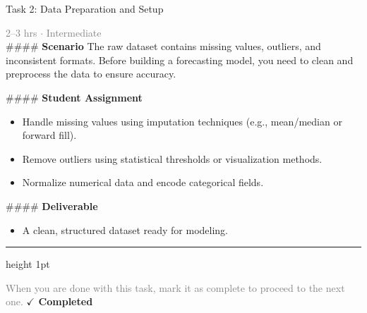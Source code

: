 \documentclass[10pt,a4paper]{article}
\begin{document}
\begin{taskbox}{Task 2: Data Preparation and Setup}

    {\small \textcolor{gray}{2--3 hrs $\cdot$ Intermediate}}\\[12pt]

    \#\#\#\# \textbf{Scenario}  
The raw dataset contains missing values, outliers, and inconsistent formats. Before building a forecasting model, you need to clean and preprocess the data to ensure accuracy.

\#\#\#\# \textbf{Student Assignment}  
\begin{itemize}
    \item Handle missing values using imputation techniques (e.g., mean/median or forward fill).  
    \item Remove outliers using statistical thresholds or visualization methods.  
    \item Normalize numerical data and encode categorical fields.  
\end{itemize}

\#\#\#\# \textbf{Deliverable}  
\begin{itemize}
    \item A clean, structured dataset ready for modeling.\par
\end{itemize}

    \vspace{16pt}

    \textcolor{cardBorder}{\hrule height 1pt}\vspace{8pt}

    \small \textcolor{gray}{When you are done with this task, mark it as complete to proceed to the next one.} \hfill \textbf{\textcolor{brandDark}{$\checkmark$ Completed}}

\end{taskbox}
\end{document}
